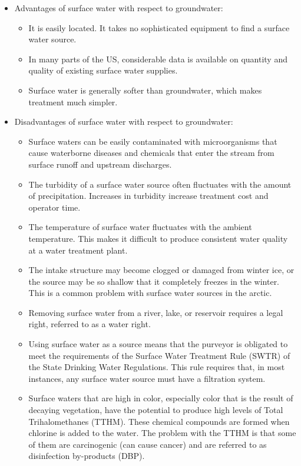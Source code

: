 \begin{itemize}
\begin{enumerate}
\begin{itemize}
\item Advantages of surface water with respect to groundwater:
\begin{itemize}
\item It is easily located. It takes no sophisticated equipment to find a surface water source.
\item In many parts of the US, considerable data is available on quantity and quality of existing surface water supplies.
\item Surface water is generally softer than groundwater, which makes treatment much simpler.
\end{itemize}
\item Disadvantages of surface water with respect to groundwater:
\begin{itemize}
\item Surface waters can be easily contaminated with microorganisms that cause waterborne diseases and chemicals that enter the stream from surface runoff and upstream discharges.
\item The turbidity of a surface water source often fluctuates with the amount of precipitation. Increases in turbidity increase treatment cost and operator time.
\item The temperature of surface water fluctuates with the ambient temperature. This makes it difficult to produce consistent water quality at a water treatment plant.
\item The intake structure may become clogged or damaged from winter ice, or the source may be so shallow that it completely freezes in the winter. This is a common problem with surface water sources in the arctic.
\item Removing surface water from a river, lake, or reservoir requires a legal right, referred to as a water right. 
\item Using surface water as a source means that the purveyor is obligated to meet the requirements of the Surface Water Treatment Rule (SWTR) of the State Drinking Water Regulations. This rule requires that, in most instances, any surface water source must have a filtration system.
\item Surface waters that are high in color, especially color that is the result of decaying vegetation, have the potential to produce high levels of Total Trihalomethanes (TTHM). These chemical compounds are formed when chlorine is added to the water. The problem with the TTHM is that some of them are carcinogenic (can cause cancer) and are referred to as disinfection by-products (DBP).
\end{itemize}
\end{itemize}
\end{enumerate}


\end{itemize}
